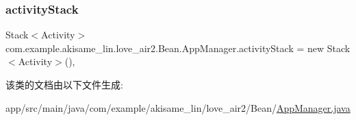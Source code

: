 \subsubsection{\texorpdfstring{activityStack}{activityStack}}
{\footnotesize\ttfamily Stack$<$Activity$>$ com.\+example.\+akisame\+\_\+lin.\+love\+\_\+air2.\+Bean.\+App\+Manager.\+activity\+Stack = new Stack$<$Activity$>$()\hspace{0.3cm}{\ttfamily [static]}, {\ttfamily [private]}}



该类的文档由以下文件生成\+:\begin{DoxyCompactItemize}
\item 
app/src/main/java/com/example/akisame\+\_\+lin/love\+\_\+air2/\+Bean/\mbox{\hyperlink{_app_manager_8java}{App\+Manager.\+java}}\end{DoxyCompactItemize}
